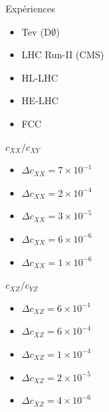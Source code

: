 \documentclass[a4paper,11pt,twoside,french]{article}
\begin{document}
                        \begin{multicols}{3}
                            Expériences
            				\begin{itemize}[label=$\triangleright$]
                				\item Tev (D$\emptyset$)
                				\item LHC Run-II (CMS)
                				\item HL-LHC 
                				\item HE-LHC 
                				\item FCC 
            				\end{itemize}
                            $c_{XX} / c_{XY}  $
                			\begin{itemize}[label=$\triangleright$]
                				\item $\Delta c_{XX} =7\times 10^{-1}$		
                				\item $\Delta c_{XX} =2\times 10^{-4}$		
                				\item $\Delta c_{XX} =3\times 10^{-5}$		
                				\item $\Delta c_{XX} =6\times 10^{-6}$		
                				\item $\Delta c_{XX} =1\times 10^{-6}$		
                			\end{itemize}
                            $c_{XZ}  / c_{YZ} $
                			\begin{itemize}[label=$\triangleright$]
                				\item $\Delta c_{XZ} =6\times 10^{-1}$		
                				\item $\Delta c_{XZ} =6\times 10^{-4}$		
                				\item $\Delta c_{XZ} =1\times 10^{-4}$		
                				\item $\Delta c_{XZ} =2\times 10^{-5}$		
                				\item $\Delta c_{XZ} =4\times 10^{-6}$		
                			\end{itemize}
                        \end{multicols}
\end{document}
